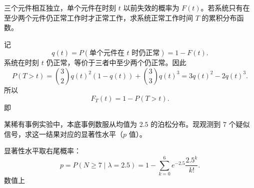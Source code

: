 \begin{question}
三个元件相互独立，单个元件在时刻 $t$ 以前失效的概率为 $F(t)$。若系统只有在至少两个元件仍正常工作时才正常工作，求系统正常工作时间 $T$ 的累积分布函数。
\begin{solution}
记
\[
q(t)=P(\text{单个元件在 }t\text{ 时仍正常})=1-F(t).
\]
系统在时刻 $t$ 仍正常，等价于三者中至少两个仍正常。因此
\[
P(T>t)=\binom32 q(t)^2(1-q(t))+\binom33 q(t)^3
=3q(t)^2-2q(t)^3.
\]
所以
\[
F_T(t)=1-P(T>t).
\]
即
\end{solution}
\end{question}

\begin{question}
某稀有事例实验中，本底事例数服从均值为 $2.5$ 的泊松分布。现观测到 $7$ 个疑似信号，求这一结果对应的显著性水平（$p$ 值）。
\begin{solution}
显著性水平取右尾概率：
\[
p=P(N\ge 7\mid \lambda=2.5)
=1-\sum_{k=0}^{6}e^{-2.5}\frac{2.5^k}{k!}.
\]
数值上
\end{solution}
\end{question}

